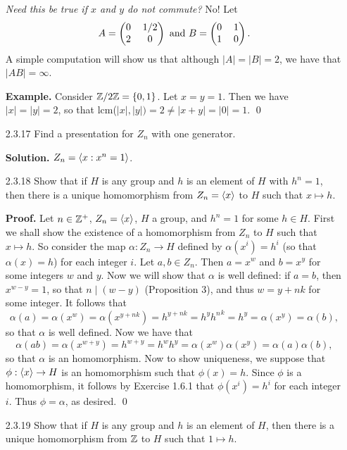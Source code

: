 \begin{enumerate}
      \textit{Need this be true if $x$ and $y$ do not commute?} No! Let
      $$
         A = \left(\begin{tabular}{@{}cc@{}}
            0 & 1/2 \\
            2 & 0
         \end{tabular}\right) \text{ and }
         B = \left(\begin{tabular}{@{}cc@{}}
            0 & 1 \\
            1 & 0
         \end{tabular}\right).
      $$
      A simple computation will show us that although $|A| = |B| = 2$, we have
      that $|AB| = \infty$.
      
      \textbf{Example.} Consider $\mathbb{Z}/2\mathbb{Z} = \{0, 1\}$. Let $x = y = 1$. Then we
      have $|x| = |y| = 2$, so that lcm($|x|, |y|) = 2 \neq |x + y| = |0| = 1$.
      \qed
   \item[2.3.17]  Find a presentation for $Z_n$ with one generator.
   
      \textbf{Solution.} $Z_n = \langle x : x^n = 1 \rangle$.
   \item[2.3.18]  Show that if $H$ is any group and $h$ is an element of $H$
                  with $h^n = 1$, then there is a unique homomorphism from
                  $Z_n = \langle x \rangle$ to $H$ such that $x \mapsto h$.
                  
      \textbf{Proof.} Let $n \in \mathbb{Z}^+$, $Z_n = \langle x \rangle$, $H$ a group, and
      $h^n  = 1$ for some $h \in H$. First we shall show the existence of a
      homomorphism from $Z_n$ to $H$ such that $x \mapsto h$. So consider the
      map $\alpha : Z_n \rightarrow H$ defined by $\alpha(x^i) = h^i$ (so that
      $\alpha(x) = h$) for each integer $i$. Let $a, b \in Z_n$. Then $a = x^w$ 
      and $b = x^y$ for some integers $w$ and $y$. Now we will show that
      $\alpha$ is well defined: if $a = b$, then $x^{w-y} = 1$, so that
      $n \mid (w - y)$ (Proposition 3), and thus $w = y + nk$ for some integer. 
      It follows that
      $$\alpha(a) = \alpha(x^w) = \alpha(x^{y+nk})=h^{y+nk}=h^{y}{h^n}^k =h^y=
        \alpha(x^y) = \alpha(b),$$
      so that $\alpha$ is well defined. Now we have that
      $$\alpha(ab) = \alpha(x^{w+y})=h^{w+y}=h^wh^y=\alpha(x^w)\alpha(x^y)=
        \alpha(a)\alpha(b),$$
      so that $\alpha$ is an homomorphism. Now to show uniqueness, we suppose
      that $\phi : \langle x \rangle \rightarrow H$ is an homomorphism such that
      $\phi(x) = h$. Since $\phi$ is a homomorphism, it follows by Exercise
      1.6.1 that $\phi(x^i) = h^i$ for each integer $i$. Thus $\phi = \alpha$,
      as desired. \qed
   \item[2.3.19]  Show that if $H$ is any group and $h$ is an element of $H$,
                  then there is a unique homomorphism from $\mathbb{Z}$ to $H$ such that
                  $1 \mapsto h$.
                  

\end{enumerate}
